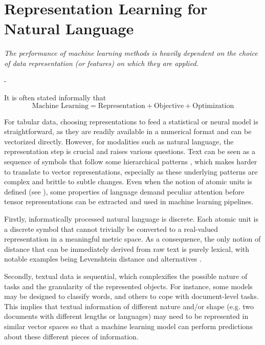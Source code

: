 \section{Representation Learning for Natural Language}

\begin{center}
  \begin{minipage}{0.7\textwidth}
    \textit{The performance of machine learning methods is heavily
dependent on the choice of data representation (or
features) on which they are applied.} 
\begin{flushright}- \citet{bengio_repr} \end{flushright}
  \end{minipage}
\end{center}

It is often stated informally that 
$$
\text{Machine Learning} = \text{Representation} + \text{Objective} + \text{Optimization}
$$

For tabular data, choosing representations to feed a statistical or neural model is straightforward, as they are readily available in a numerical format and can be vectorized directly. However, for modalities such as natural language, the representation step is crucial and raises various questions. Text can be seen as a sequence of symbols that follow some hierarchical patterns \citep{longacre}, which makes harder to translate to vector representations, especially as these underlying patterns are complex and brittle to subtle changes. Even when the notion of atomic units is defined (see ), some properties of language demand peculiar attention before tensor representations can be extracted and used in machine learning pipelines.

Firstly, informatically processed natural language is discrete. Each atomic unit is a discrete symbol that cannot trivially be converted to a real-valued representation in a meaningful metric space. As a consequence, the only notion of distance that can be immediately derived from raw text is purely lexical, with notable examples being Levenshtein distance \citep{levenshtein1966binary} and alternatives \citep{hamming, jaro}.

Secondly, textual data is sequential, which complexifies the possible nature of tasks and the granularity of the represented objects. For instance, some models may be designed to classify words, and others to cope with document-level tasks. This implies that textual information of different nature and/or shape (e.g. two documents with different lengths or languages) may need to be represented in similar vector spaces so that a machine learning model can perform predictions about these different pieces of information.


